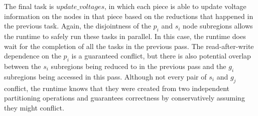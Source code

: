 The final task is $update\_voltages$, in which each piece is able to update
voltage information on the nodes in that piece based on the reductions that
happened in the previous task.  Again, the disjointness of the $p_i$ and $s_i$
node subregions allows the runtime to safely run these tasks in parallel.  In
this case, the runtime does wait for the completion of all the tasks in the 
previous pass.  The read-after-write dependence on the $p_i$ is a guaranteed
conflict, but there is also potential overlap between the $s_i$ subregions
being reduced to in the previous pass and the $g_i$ subregions being accessed
in this pass.  Although not every pair of $s_i$ and $g_j$ conflict, the
runtime knows that they were created from two independent partitioning
operations and guarantees correctness by conservatively assuming they might
conflict.

%
%
